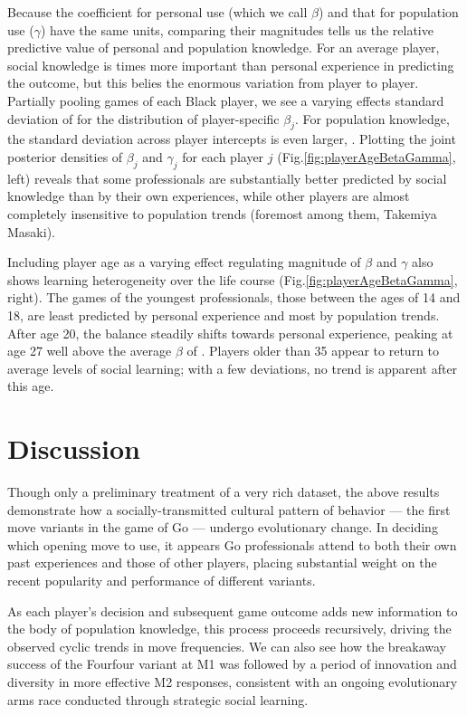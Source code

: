 \documentclass[12pt]{article}
\begin{document}
Because the coefficient for personal use (which we call $\beta$) and that for population use ($\gamma$) have the same units, comparing their magnitudes tells us the relative predictive value of personal and population knowledge. For an average player, social knowledge is \socialIndyRatio{} times more important than personal experience in predicting the outcome, but this belies the enormous variation from player to player. Partially pooling games of each Black player, we see a varying effects standard deviation of \playerIndyVaref{} for the distribution of player-specific $\beta_j$. For population knowledge, the standard deviation across player intercepts is even larger, \playerSocialVaref. Plotting the joint posterior densities of $\beta_j$ and $\gamma_j$ for each player $j$ (Fig.\;\ref{fig:playerAgeBetaGamma}, left) reveals that some professionals are substantially better predicted by social knowledge than by their own experiences, while other players are almost completely insensitive to population trends (foremost among them, Takemiya Masaki).

Including player age as a varying effect regulating magnitude of $\beta$ and $\gamma$ also shows learning heterogeneity over the life course (Fig.\;\ref{fig:playerAgeBetaGamma}, right). The games of the youngest professionals, those between the ages of 14 and 18, are least predicted by personal experience and most by population trends. After age 20, the balance steadily shifts towards personal experience, peaking at age 27 well above the average $\beta$ of \betaIndUse. Players older than 35 appear to return to average levels of social learning; with a few deviations, no trend is apparent after this age.

\section{Discussion}

Though only a preliminary treatment of a very rich dataset, the above results demonstrate how a socially-transmitted cultural pattern of behavior --- the first move variants in the game of Go --- undergo evolutionary change. In deciding which opening move to use, it appears Go professionals attend to both their own past experiences and those of other players, placing substantial weight on the recent popularity and performance of different variants.

As each player's decision and subsequent game outcome adds new information to the body of population knowledge, this process proceeds recursively, driving the observed cyclic trends in move frequencies. We can also see how the breakaway success of the Fourfour variant at M1 was followed by a period of innovation and diversity in more effective M2 responses, consistent with an ongoing evolutionary arms race conducted through strategic social learning.
\end{document}
